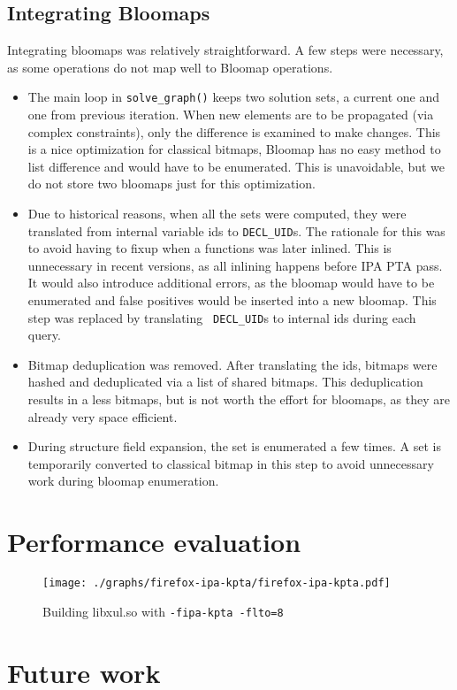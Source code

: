 \subsection{Integrating Bloomaps}

Integrating bloomaps was relatively straightforward. A few steps were necessary, as some operations do not map well to Bloomap operations.

\begin{itemize}
	\item The main loop in {\tt solve\_graph()} keeps two solution sets, a
		current one and one from previous iteration. When new elements are to
		be propagated (via complex constraints), only the difference is
		examined to make changes. This is a nice optimization for classical
		bitmaps, Bloomap has no easy method to list difference and would have
		to be enumerated. This is unavoidable, but we do not store two bloomaps
		just for this optimization.
	\item Due to historical reasons, when all the sets were computed, they were
		translated from internal variable ids to {\tt DECL\_UID}s. The
		rationale for this was to avoid having to fixup when a functions was
		later inlined. This is unnecessary in recent versions, as all inlining
		happens before IPA PTA pass. It would also introduce additional errors,
		as the bloomap would have to be enumerated and false positives would be
		inserted into a new bloomap. This step was replaced by translating {\tt
		DECL\_UID}s to internal ids during each query.
	\item Bitmap deduplication was removed. After translating the ids, bitmaps
		were hashed and deduplicated via a list of shared bitmaps. This
		deduplication results in a less bitmaps, but is not worth the effort
		for bloomaps, as they are already very space efficient.
	\item During structure field expansion, the set is enumerated a few times.
		A set is temporarily converted to classical bitmap in this step to
		avoid unnecessary work during bloomap enumeration.
\end{itemize}

\section{Performance evaluation}

\begin{figure}[h!]
	\label{figure-firefox-ipa-kpta}
	\centering
	\texttt{[image: ./graphs/firefox-ipa-kpta/firefox-ipa-kpta.pdf]}
	\caption{Building libxul.so with {\tt -fipa-kpta -flto=8}}
\end{figure}


\section{Future work}
